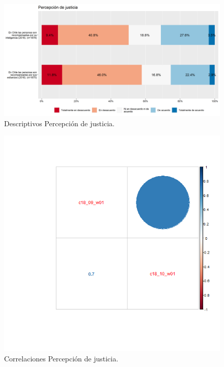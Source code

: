 \documentclass[
  12pt,
]{book}
\begin{document}
\begin{figure}[H]

{\centering \includegraphics[width=1\linewidth,height=1\textheight]{output/graphs/justicia} 

}

\caption{Descriptivos Percepción de justicia.}\label{fig:justicia}
\end{figure}

\begin{figure}[H]

{\centering \includegraphics[width=1\linewidth,height=1\textheight]{output/graphs/justicia_cor} 

}

\caption{Correlaciones Percepción de justicia.}\label{fig:justicia-cor}
\end{figure}
\end{document}
